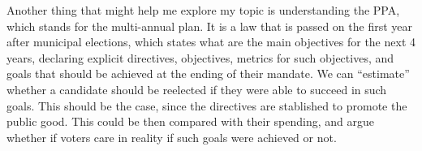 \documentclass[12pt, a4paper]{article}
\begin{document}
\quad Another thing that might help me explore my topic is understanding the PPA, which stands for the multi-annual plan. It is a law that is passed on the first year after municipal elections, which states what are the main objectives for the next 4 years, declaring explicit directives, objectives, metrics for such objectives, and goals that should be achieved at the ending of their mandate. We can ``estimate'' whether a candidate should be reelected if they were able to succeed in such goals. This should be the case, since the directives are stablished to promote the public good. This could be then compared with their spending, and argue whether if voters care in reality if such goals were achieved or not.



\end{document}
